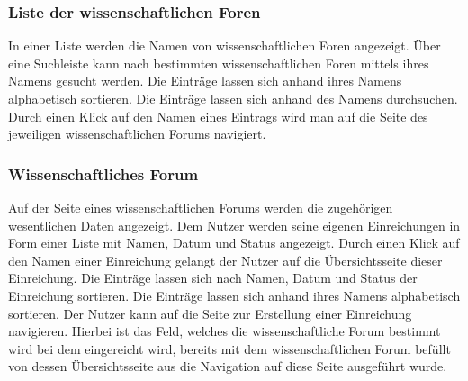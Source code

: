 \subsubsection{Liste der wissenschaftlichen Foren}
\begin{description}
     In einer Liste werden die Namen von wissenschaftlichen Foren angezeigt.
     Über eine Suchleiste kann nach bestimmten wissenschaftlichen Foren mittels
    ihres Namens gesucht werden.
     Die Einträge lassen sich anhand ihres Namens alphabetisch sortieren.
     Die Einträge lassen sich anhand des Namens durchsuchen.
     Durch einen Klick auf den Namen eines Eintrags wird man auf die Seite des
    jeweiligen wissenschaftlichen Forums navigiert.
\end{description}

\subsubsection{Wissenschaftliches Forum}
\begin{description}
     Auf der Seite eines wissenschaftlichen Forums werden die zugehörigen wesentlichen Daten
    angezeigt. %
     Dem Nutzer werden seine eigenen Einreichungen in Form einer Liste mit Namen, Datum und Status
    angezeigt.
     Durch einen Klick auf den Namen einer Einreichung gelangt der Nutzer auf die Übersichtsseite
    dieser Einreichung.
     Die Einträge lassen sich nach Namen, Datum und Status
    der Einreichung sortieren.
     Die Einträge lassen sich anhand ihres Namens alphabetisch sortieren.
     Der Nutzer kann auf die Seite zur Erstellung einer Einreichung navigieren. Hierbei ist
    das Feld, welches die wissenschaftliche Forum bestimmt wird bei dem eingereicht wird, bereits mit
    dem wissenschaftlichen Forum befüllt von dessen Übersichtsseite aus die Navigation auf diese
    Seite ausgeführt wurde.
\end{description}


